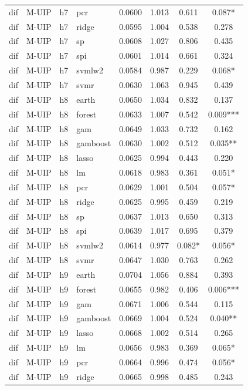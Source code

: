 \begin{ThreePartTable}
\begin{longtable}[t]{llclcccc}
dif & M-UIP & h7 & pcr & 0.0600 & 1.013 & 0.611 & 0.087*\\
dif & M-UIP & h7 & ridge & 0.0595 & 1.004 & 0.538 & 0.278\\
dif & M-UIP & h7 & sp & 0.0608 & 1.027 & 0.806 & 0.435\\
dif & M-UIP & h7 & spi & 0.0601 & 1.014 & 0.661 & 0.324\\
dif & M-UIP & h7 & svmlw2 & 0.0584 & 0.987 & 0.229 & 0.068*\\
dif & M-UIP & h7 & svmr & 0.0630 & 1.063 & 0.945 & 0.439\\
\addlinespace
dif & M-UIP & h8 & earth & 0.0650 & 1.034 & 0.832 & 0.137\\
dif & M-UIP & h8 & forest & 0.0633 & 1.007 & 0.542 & 0.009***\\
dif & M-UIP & h8 & gam & 0.0649 & 1.033 & 0.732 & 0.162\\
dif & M-UIP & h8 & gamboost & 0.0630 & 1.002 & 0.512 & 0.035**\\
dif & M-UIP & h8 & lasso & 0.0625 & 0.994 & 0.443 & 0.220\\
dif & M-UIP & h8 & lm & 0.0618 & 0.983 & 0.361 & 0.051*\\
dif & M-UIP & h8 & pcr & 0.0629 & 1.001 & 0.504 & 0.057*\\
dif & M-UIP & h8 & ridge & 0.0625 & 0.995 & 0.459 & 0.219\\
dif & M-UIP & h8 & sp & 0.0637 & 1.013 & 0.650 & 0.313\\
dif & M-UIP & h8 & spi & 0.0639 & 1.017 & 0.695 & 0.379\\
dif & M-UIP & h8 & svmlw2 & 0.0614 & 0.977 & 0.082* & 0.056*\\
dif & M-UIP & h8 & svmr & 0.0647 & 1.030 & 0.763 & 0.262\\
\addlinespace
dif & M-UIP & h9 & earth & 0.0704 & 1.056 & 0.884 & 0.393\\
dif & M-UIP & h9 & forest & 0.0655 & 0.982 & 0.406 & 0.006***\\
dif & M-UIP & h9 & gam & 0.0671 & 1.006 & 0.544 & 0.115\\
dif & M-UIP & h9 & gamboost & 0.0669 & 1.004 & 0.524 & 0.040**\\
dif & M-UIP & h9 & lasso & 0.0668 & 1.002 & 0.514 & 0.265\\
dif & M-UIP & h9 & lm & 0.0656 & 0.983 & 0.369 & 0.065*\\
dif & M-UIP & h9 & pcr & 0.0664 & 0.996 & 0.474 & 0.056*\\
dif & M-UIP & h9 & ridge & 0.0665 & 0.998 & 0.485 & 0.243\\

\end{longtable}
\end{ThreePartTable}

